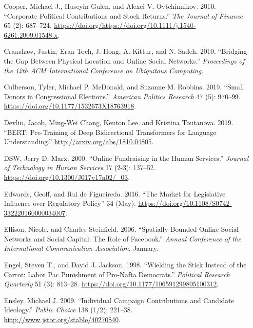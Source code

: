 \documentclass[12pt,]{article}
\begin{document}
\leavevmode\hypertarget{ref-cooper2010}{}%
Cooper, Michael J., Huseyin Gulen, and Alexei V. Ovtchinnikov. 2010.
``Corporate Political Contributions and Stock Returns.'' \emph{The
Journal of Finance} 65 (2): 687--724.
\url{https://doi.org/https://doi.org/10.1111/j.1540-6261.2009.01548.x}.

\leavevmode\hypertarget{ref-cranshaw2010}{}%
Cranshaw, Justin, Eran Toch, J. Hong, A. Kittur, and N. Sadeh. 2010.
``Bridging the Gap Between Physical Location and Online Social
Networks.'' \emph{Proceedings of the 12th ACM International Conference
on Ubiquitous Computing}.

\leavevmode\hypertarget{ref-culberson2019}{}%
Culberson, Tyler, Michael P. McDonald, and Suzanne M. Robbins. 2019.
``Small Donors in Congressional Elections.'' \emph{American Politics
Research} 47 (5): 970--99.
\url{https://doi.org/10.1177/1532673X18763918}.

\leavevmode\hypertarget{ref-bert}{}%
Devlin, Jacob, Ming-Wei Chang, Kenton Lee, and Kristina Toutanova. 2019.
``BERT: Pre-Training of Deep Bidirectional Transformers for Language
Understanding.'' \url{http://arxiv.org/abs/1810.04805}.

\leavevmode\hypertarget{ref-marx2000}{}%
DSW, Jerry D. Marx. 2000. ``Online Fundraising in the Human Services.''
\emph{Journal of Technology in Human Services} 17 (2-3): 137--52.
\url{https://doi.org/10.1300/J017v17n02/_03}.

\leavevmode\hypertarget{ref-edwards2016}{}%
Edwards, Geoff, and Rui de Figueiredo. 2016. ``The Market for
Legislative Influence over Regulatory Policy'' 34 (May).
\url{https://doi.org/10.1108/S0742-332220160000034007}.

\leavevmode\hypertarget{ref-ellison2006}{}%
Ellison, Nicole, and Charles Steinfield. 2006. ``Spatially Bounded
Online Social Networks and Social Capital: The Role of Facebook.''
\emph{Annual Conference of the International Communication Association},
January.

\leavevmode\hypertarget{ref-engel1998}{}%
Engel, Steven T., and David J. Jackson. 1998. ``Wielding the Stick
Instead of the Carrot: Labor Pac Punishment of Pro-Nafta Democrats.''
\emph{Political Research Quarterly} 51 (3): 813--28.
\url{https://doi.org/10.1177/106591299805100312}.

\leavevmode\hypertarget{ref-ensley2009}{}%
Ensley, Michael J. 2009. ``Individual Campaign Contributions and
Candidate Ideology.'' \emph{Public Choice} 138 (1/2): 221--38.
\url{http://www.jstor.org/stable/40270840}.
\end{document}
